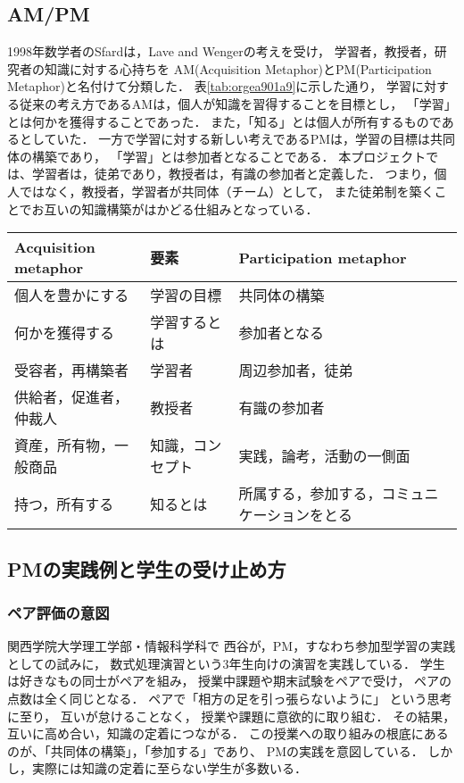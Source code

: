 \documentclass{hissymp}
\begin{document}
\subsection{AM/PM}
\label{sec:org66ca36e}
1998年数学者のSfardは，Lave and Wengerの考えを受け，
学習者，教授者，研究者の知識に対する心持ちを
AM(Acquisition Metaphor)とPM(Participation Metaphor)と名付けて分類した．
表\ref{tab:orgea901a9}に示した通り，
学習に対する従来の考え方であるAMは，個人が知識を習得することを目標とし，
「学習」とは何かを獲得することであった．
また，「知る」とは個人が所有するものであるとしていた．
一方で学習に対する新しい考えであるPMは，学習の目標は共同体の構築であり，
「学習」とは参加者となることである．
本プロジェクトでは、学習者は，徒弟であり，教授者は，有識の参加者と定義した．
つまり，個人ではなく，教授者，学習者が共同体（チーム）として，
また徒弟制を築くことでお互いの知識構築がはかどる仕組みとなっている．

\begin{table*}[bt]
\caption{\label{tab:orgea901a9}
Acquisition metaphorとParticipation metaphorの比較．}
\centering
\begin{tabular}{lll}
\hline
Acquisition metaphor & 要素 & Participation metaphor\\
\hline
個人を豊かにする & 学習の目標 & 共同体の構築\\
何かを獲得する & 学習するとは & 参加者となる\\
受容者，再構築者 & 学習者 & 周辺参加者，徒弟\\
供給者，促進者，仲裁人 & 教授者 & 有識の参加者\\
資産，所有物，一般商品 & 知識，コンセプト & 実践，論考，活動の一側面\\
持つ，所有する & 知るとは & 所属する，参加する，コミュニケーションをとる\\
\hline
\end{tabular}
\end{table*}

\subsection{PMの実践例と学生の受け止め方}
\label{sec:org2a377cc}
\subsubsection{ペア評価の意図}
\label{sec:org209ea07}
関西学院大学理工学部・情報科学科で
西谷が，PM，すなわち参加型学習の実践としての試みに，
数式処理演習という3年生向けの演習を実践している．
学生は好きなもの同士がペアを組み，
授業中課題や期末試験をペアで受け，
ペアの点数は全く同じとなる．
ペアで「相方の足を引っ張らないように」
という思考に至り，
互いが怠けることなく，
授業や課題に意欲的に取り組む．
その結果，互いに高め合い，知識の定着につながる．
この授業への取り組みの根底にあるのが、「共同体の構築」，「参加する」であり、
PMの実践を意図している．
しかし，実際には知識の定着に至らない学生が多数いる．
\end{document}
